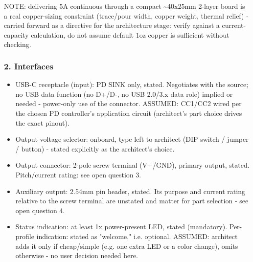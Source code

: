 \documentclass[11pt,a4paper]{article}
\begin{document}
NOTE: delivering 5A continuous through a compact \textasciitilde{}40x25mm 2-layer board is a real copper-sizing constraint (trace/pour width, copper weight, thermal relief) - carried forward as a directive for the architecture stage: verify against a current-capacity calculation, do not assume default 1oz copper is sufficient without checking.

\subsubsection*{2. Interfaces}
\begin{itemize}
\item USB-C receptacle (input): PD SINK only, stated. Negotiates with the
source; no USB data function (no D+/D-, no USB 2.0/3.x data role) implied
or needed - power-only use of the connector. ASSUMED: CC1/CC2 wired per
the chosen PD controller's application circuit (architect's part choice
drives the exact pinout).
\item Output voltage selector: onboard, type left to architect (DIP switch /
jumper / button) - stated explicitly as the architect's choice.
\item Output connector: 2-pole screw terminal (V+/GND), primary output,
stated. Pitch/current rating: see open question 3.
\item Auxiliary output: 2.54mm pin header, stated. Its purpose and current
rating relative to the screw terminal are unstated and matter for part
selection - see open question 4.
\item Status indication: at least 1x power-present LED, stated (mandatory).
Per-profile indication: stated as "welcome," i.e. optional. ASSUMED:
architect adds it only if cheap/simple (e.g. one extra LED or a color
change), omits otherwise - no user decision needed here.
\end{itemize}
\end{document}
